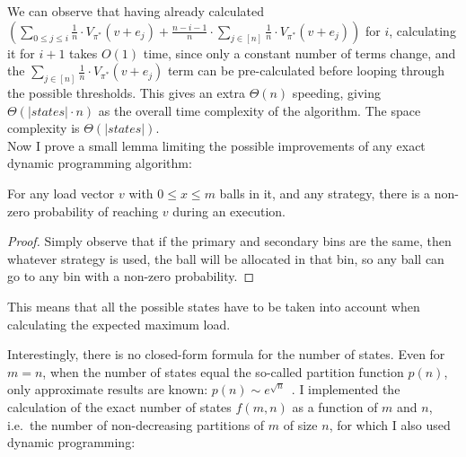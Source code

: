 We can observe that having already calculated $(\sum_{0\leq j \leq i} \frac{1}{n}\cdot V_{\pi^*}(v+e_j) + \frac{n-i-1}{n} \cdot  \sum_{j \in [n]} \frac{1}{n}\cdot V_{\pi^*}(v+e_j))$ for $i$, calculating it for $i+1$ takes $O(1)$ time, since only a constant number of terms change, and the $\sum_{j \in [n]} \frac{1}{n}\cdot V_{\pi^*}(v+e_j)$ term can be pre-calculated before looping through the possible thresholds. This gives an extra $\Theta(n)$ speeding, giving $\Theta(|states|\cdot n)$ as the overall time complexity of the algorithm. The space complexity is $\Theta(|states|)$.\\


Now I prove a small lemma limiting the possible improvements of any exact dynamic programming algorithm:


\begin{lemma} \label{lemma: everystatereachable}
For any load vector $v$ with $0\leq x\leq m$ balls in it, and any strategy, there is a non-zero probability of reaching $v$ during an execution.
\end{lemma}

\begin{proof}
    Simply observe that if the primary and secondary bins are the same, then whatever strategy is used, the ball will be allocated in that bin, so any ball can go to any bin with a non-zero probability.
\end{proof}

This means that all the possible states have to be taken into account when calculating the expected maximum load.



Interestingly, there is no closed-form formula for the number of states.  Even for $m=n$, when the number of states equal the so-called partition function $p(n)$, only approximate results are known: $p(n) \sim e^{\sqrt{n}}$~\cite{hardy1918partitionfunction}. I implemented the calculation of the exact number of states $f(m, n)$ as a function of $m$ and $n$, i.e.\ the number of non-decreasing partitions of $m$ of size $n$, for which I also used dynamic programming:

